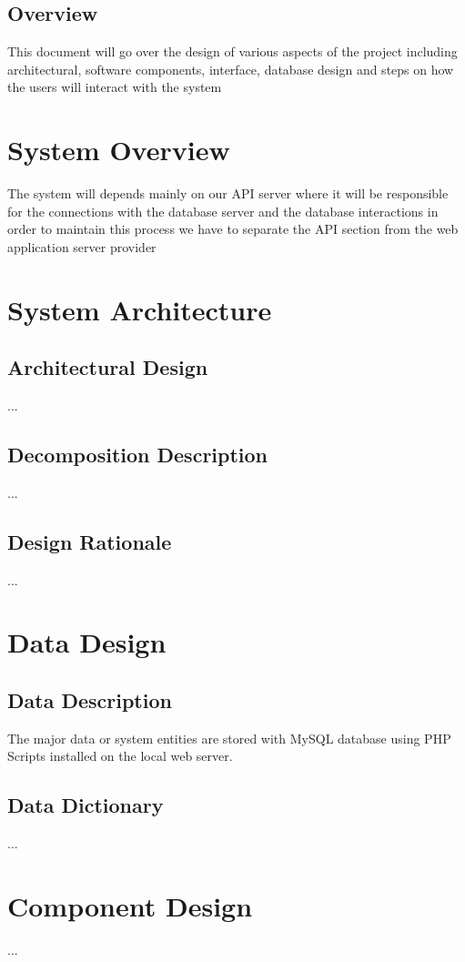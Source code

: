 \documentclass[]{article}
\begin{document}
\subsection{Overview}
This document will go over the design of various aspects of the project including architectural, software components, interface, database design and steps on how the users will interact with the system 


\section{System Overview}
The system will depends mainly on our API server where it will be responsible for the connections with the database server and the database interactions in order to maintain this process we have to separate the API section from the web application server provider   

\section{System Architecture}
\subsection{Architectural Design}
...


\subsection{Decomposition Description}
...


\subsection{Design Rationale}
...


\section{Data Design}
\subsection{Data Description}
The major data or system entities are stored with MySQL database using PHP Scripts installed on the local web server.

\subsection {Data Dictionary}
...

\section{Component Design}
...
\end{document}
